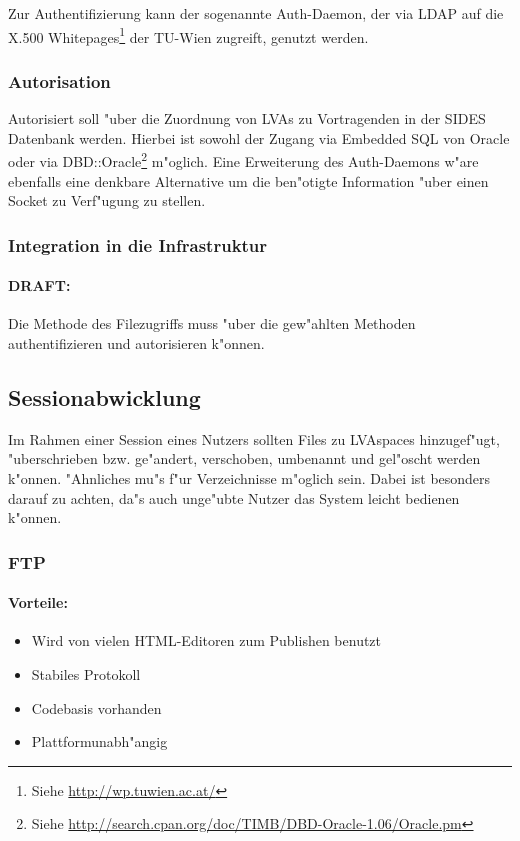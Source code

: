 \documentclass[12pt,a4paper]{article}
\begin{document}
Zur Authentifizierung kann der sogenannte Auth-Daemon, der via LDAP auf die
X.500 Whitepages\footnote{Siehe \url{http://wp.tuwien.ac.at/}} der TU-Wien
zugreift, genutzt werden.


\subsubsection{Autorisation}

Autorisiert soll "uber die Zuordnung von LVAs zu Vortragenden in der SIDES
Datenbank werden. Hierbei ist sowohl der Zugang via Embedded SQL von Oracle
oder via DBD::Oracle\footnote{Siehe
\url{http://search.cpan.org/doc/TIMB/DBD-Oracle-1.06/Oracle.pm}} m"oglich.
Eine Erweiterung des Auth-Daemons w"are ebenfalls eine denkbare Alternative
um die ben"otigte Information "uber einen Socket zu Verf"ugung zu stellen.

\subsubsection{Integration in die Infrastruktur}

\paragraph{DRAFT:}{Die Methode des Filezugriffs muss "uber die gew"ahlten
Methoden authentifizieren und autorisieren k"onnen.}

\subsection{Sessionabwicklung}

Im Rahmen einer Session eines Nutzers sollten Files zu LVAspaces
hinzugef"ugt, "uberschrieben bzw. ge"andert, verschoben, umbenannt und
gel"oscht werden k"onnen. "Ahnliches mu"s f"ur Verzeichnisse m"oglich sein. 
Dabei ist besonders darauf zu achten, da"s auch unge"ubte Nutzer das System
leicht bedienen k"onnen.


\subsubsection{FTP}

\paragraph{Vorteile: } 
\begin{itemize}
\item{Wird von vielen HTML-Editoren zum Publishen benutzt}
\item{Stabiles Protokoll}
\item{Codebasis vorhanden}
\item{Plattformunabh"angig}
\end{itemize}
\end{document}
